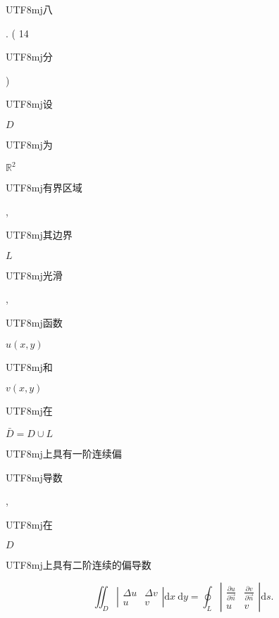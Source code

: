 \documentclass[10pt]{article}
\begin{document}
\begin{CJK}{UTF8}{mj}八\end{CJK}. ( 14 \begin{CJK}{UTF8}{mj}分\end{CJK}) \begin{CJK}{UTF8}{mj}设\end{CJK} $D$ \begin{CJK}{UTF8}{mj}为\end{CJK} $\mathbb{R}^{2}$ \begin{CJK}{UTF8}{mj}有界区域\end{CJK}, \begin{CJK}{UTF8}{mj}其边界\end{CJK} $L$ \begin{CJK}{UTF8}{mj}光滑\end{CJK}, \begin{CJK}{UTF8}{mj}函数\end{CJK} $u(x, y)$ \begin{CJK}{UTF8}{mj}和\end{CJK} $v(x, y)$ \begin{CJK}{UTF8}{mj}在\end{CJK} $\bar{D}=D \cup L$ \begin{CJK}{UTF8}{mj}上具有一阶连续偏\end{CJK} \begin{CJK}{UTF8}{mj}导数\end{CJK}, \begin{CJK}{UTF8}{mj}在\end{CJK} $D$ \begin{CJK}{UTF8}{mj}上具有二阶连续的偏导数\end{CJK}
$$
\iint_{D}\left|\begin{array}{cc}
\Delta u & \Delta v \\
u & v
\end{array}\right| \mathrm{d} x \mathrm{~d} y=\oint_{L}\left|\begin{array}{cc}
\frac{\partial u}{\partial \vec{n}} & \frac{\partial v}{\partial \vec{n}} \\
u & v
\end{array}\right| \mathrm{d} s .
$$
\end{document}
